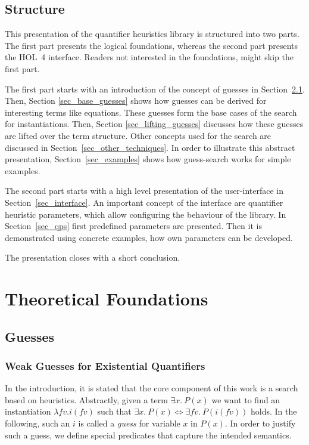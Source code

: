 \documentclass[a4paper,12pt,DIV=12,oneside]{scrbook}
\newcommand{\fv}{\textit{fv}}
\theoremstyle{definition}
\theoremstyle{remark}
\begin{document}
\section{Structure}

This presentation of the quantifier heuristics library is structured into two parts.
The first part presents the logical foundations, whereas the second part presents the HOL~4 interface.
Readers not interested in the foundations, might skip the first part.

The first part starts with an introduction of the concept of guesses in Section~\ref{sec_guesses}. Then,
Section \ref{sec_base_guesses} shows how guesses can be derived for interesting terms like equations.
These guesses form the base cases of the search for instantiations. Then, Section \ref{sec_lifting_guesses}
discusses how these guesses are lifted over the term structure. Other concepts used for the search
are discussed in Section~\ref{sec_other_techniques}. In order to illustrate
this abstract presentation, Section~\ref{sec_examples} shows how
guess-search works for simple examples.

The second part starts with a high level presentation of the user-interface in 
Section~\ref{sec_interface}. An important concept of the interface are
quantifier heuristic parameters, which allow configuring the behaviour of the library.
In Section~\ref{sec_qps} first predefined parameters are presented.
Then it is demonstrated using concrete examples, how own parameters can be developed.

The presentation closes with a short conclusion.


\chapter{Theoretical Foundations}

\section{Guesses}\label{sec_guesses}

\subsection{Weak Guesses for Existential Quantifiers}

In the introduction, it is stated that the core component of this work
is a search based on heuristics. Abstractly, given a term $\exists x.\
P(x)$ we want to find an instantiation $\lambda \fv. i(\fv)$ such that
$\exists x.\ P(x) \Longleftrightarrow \exists \fv.\ P(i(\fv))$
holds. In the following, such an $i$ is called a \emph{guess} for 
variable $x$ in $P(x)$. In order to justify such a guess, we define
special predicates that capture the intended semantics.
\end{document}
